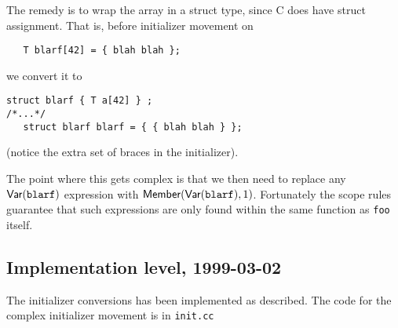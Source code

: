 \begin{docpart}
The remedy is to wrap the array in a struct type, since C does have
struct assignment. That is, before initializer movement on
\begin{verbatim}
   T blarf[42] = { blah blah };
\end{verbatim}
we convert it to
\begin{verbatim}
struct blarf { T a[42] } ;
/*...*/
   struct blarf blarf = { { blah blah } };
\end{verbatim}
(notice the extra set of braces in the initializer).

The point where this gets complex is that we then need to replace
any $\textsf{Var}(\texttt{blarf})$ expression with
$\textsf{Member}(\textsf{Var}(\texttt{blarf}),1)$. Fortunately the scope
rules guarantee that such expressions are only found within the same
function as \texttt{foo} itself.

\subsection{Implementation level, 1999-03-02}

The initializer conversions has been implemented as described.
The code for the complex initializer movement is in \texttt{init.cc}

\end{docpart}

